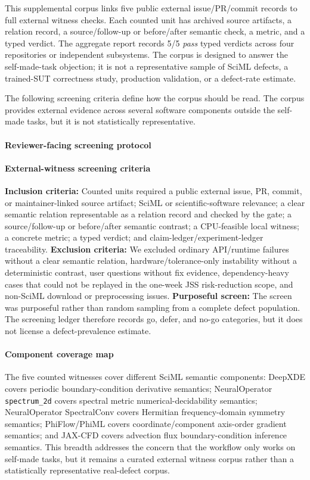 This supplemental corpus links five public external issue/PR/commit records to
full external witness checks. Each counted unit has archived source artifacts,
a relation record, a source/follow-up or before/after semantic check, a metric, and a
typed verdict. The aggregate report records 5/5 \emph{pass} typed verdicts
across four repositories or independent subsystems. The corpus is
designed to answer the self-made-task objection; it is not a representative
sample of SciML defects, a trained-SUT correctness study, production validation,
or a defect-rate estimate.

The following screening criteria define how the corpus should be read. The
corpus provides external evidence across several software components outside
the self-made tasks, but it is not statistically representative.

\paragraph{Reviewer-facing screening protocol}
\paragraph{External-witness screening criteria}
\textbf{Inclusion criteria:} Counted units required a public external issue,
PR, commit, or maintainer-linked source artifact; SciML or
scientific-software relevance; a clear semantic relation representable as a relation record and checked by the gate; a source/follow-up or before/after semantic contrast; a
CPU-feasible local witness; a concrete metric; a typed verdict; and
claim-ledger/experiment-ledger traceability.
\textbf{Exclusion criteria:} We excluded ordinary API/runtime failures without
a clear semantic relation, hardware/tolerance-only instability without a
deterministic contrast, user questions without fix evidence, dependency-heavy
cases that could not be replayed in the one-week JSS risk-reduction scope, and
non-SciML download or preprocessing issues. \textbf{Purposeful screen:} The
screen was purposeful rather than random sampling from a complete defect
population. The screening ledger therefore records go, defer, and no-go
categories, but it does not license a defect-prevalence estimate.

\paragraph{Component coverage map}
The five counted witnesses cover different SciML semantic components:
DeepXDE covers periodic boundary-condition derivative semantics;
NeuralOperator \texttt{spectrum\_2d} covers spectral metric numerical-decidability semantics; NeuralOperator SpectralConv covers
Hermitian frequency-domain symmetry semantics; PhiFlow/PhiML covers
coordinate/component axis-order gradient semantics; and JAX-CFD covers
advection flux boundary-condition inference semantics. This breadth addresses
the concern that the workflow only works on self-made tasks, but it remains a
curated external witness corpus rather than a statistically representative
real-defect corpus.

